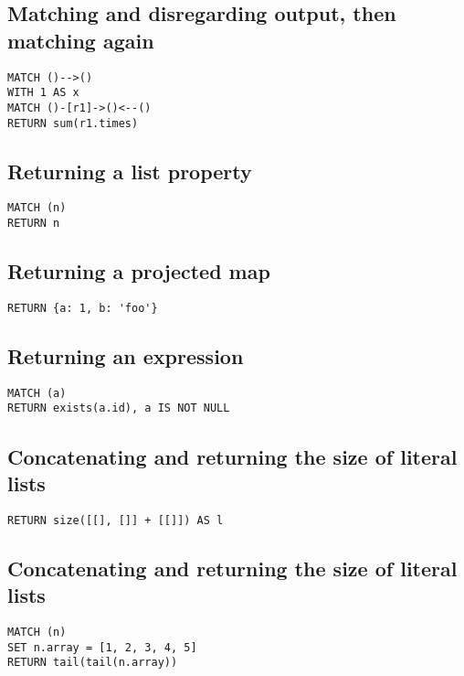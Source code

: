 \subsection{Matching and disregarding output, then matching again}

\begin{lstlisting}
MATCH ()-->()
WITH 1 AS x
MATCH ()-[r1]->()<--()
RETURN sum(r1.times)
\end{lstlisting}

\subsection{Returning a list property}

\begin{lstlisting}
MATCH (n)
RETURN n
\end{lstlisting}

\subsection{Returning a projected map}

\begin{lstlisting}
RETURN {a: 1, b: 'foo'}
\end{lstlisting}

\subsection{Returning an expression}

\begin{lstlisting}
MATCH (a)
RETURN exists(a.id), a IS NOT NULL
\end{lstlisting}

\subsection{Concatenating and returning the size of literal lists}

\begin{lstlisting}
RETURN size([[], []] + [[]]) AS l
\end{lstlisting}

\subsection{Concatenating and returning the size of literal lists}

\begin{lstlisting}
MATCH (n)
SET n.array = [1, 2, 3, 4, 5]
RETURN tail(tail(n.array))
\end{lstlisting}

